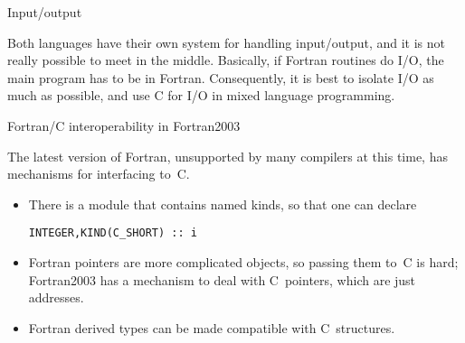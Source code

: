  {Input/output}

Both languages have their own system for handling input/output, and it
is not really possible to meet in the middle. Basically, if Fortran
routines do I/O, the main program has to be in Fortran. Consequently,
it is best to isolate I/O as much as possible, and use C for I/O in
mixed language programming.

 {Fortran/C interoperability in Fortran2003}

The latest version of Fortran, unsupported by many compilers at this
time, has mechanisms for interfacing to~C.
\begin{itemize}
\item There is a module that contains named kinds, so that one can declare
\begin{verbatim}
INTEGER,KIND(C_SHORT) :: i
\end{verbatim}
\item Fortran pointers are more complicated objects, so passing them
  to~C is hard; Fortran2003 has a mechanism to deal with C~pointers,
  which are just addresses.
\item Fortran derived types can be made compatible with C~structures.
\end{itemize}

